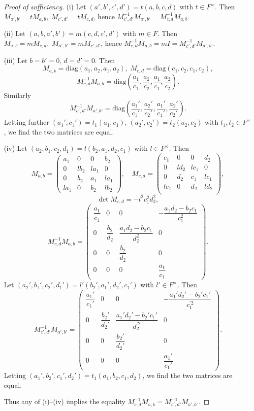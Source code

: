 \documentclass{article}
\begin{document}
\begin{proof}[Proof of sufficiency]
(i) Let $(a',b',c',d')=t(a,b,c,d)$ with $t\in F^{\times}$. Then
$M_{a',b'}=t M_{a,b},\; M_{c',d'}=t M_{c,d}$,
hence
$
M_{c',d'}^{-1}M_{a',b'} =M_{c,d}^{-1}M_{a,b}$.

(ii) Let $(a,b,a',b')=m(c,d,c',d')$ with $m\in F$.
Then
$M_{a,b}=m M_{c,d} , \; M_{a',b'}=m M_{c',d'}$,
hence
$M_{c,d}^{-1}M_{a,b}=mI=M_{c',d'}^{-1}M_{a',b'}$.

(iii)
Let $b=b'=0$, $d=d'=0$. 
Then
$$
M_{a,b}=\text{diag}(a_1,a_2,a_1,a_2),\;
M_{c,d}=\text{diag}(c_1,c_2,c_1,c_2),
$$
$$
M_{c,d}^{-1}M_{a,b}=\text{diag}(\frac{a_1}{c_1},\frac{a_2}{c_2},\frac{a_1}{c_1},\frac{a_2}{c_2}).
$$
Similarly
$$
M_{c',d'}^{-1}M_{a',b'}=\text{diag}(\frac{a_1'}{c_1'},\frac{a_2'}{c_2'},\frac{a_1'}{c_1'},\frac{a_2'}{c_2'}).
$$
Letting further $(a_1',c_1')=t_1(a_1,c_1)$, $(a_2',c_2')=t_2(a_2,c_2)$
with $t_1,t_2\in F^{\times}$, 
we find the two matrices are equal.

(iv)
Let $(a_2,b_1,c_2,d_1)=l(b_2,a_1,d_2,c_1)$ with $l\in F^{\times}$. Then
$$
M_{a,b}=
\begin{pmatrix}
a_1 & 0 & 0 & b_2 \\
0 & l b_2 & l a_1 & 0 \\
0 & b_2 & a_1 & l a_1\\
l a_1 & 0 & b_2 & l b_2 
\end{pmatrix},\quad
M_{c,d}=
\begin{pmatrix}
c_1 & 0 & 0 & d_2 \\
0 & l d_2 & l c_1 & 0 \\
0 & d_2 & c_1 & l c_1 \\
l c_1 & 0 & d_2 & l d_2 \\
\end{pmatrix},
$$
$$
\det M_{c,d}=-l^2 c_1^2 d_2^2,
$$
$$
M_{c,d}^{-1}M_{a,b}=
\begin{pmatrix}
\dfrac{a_1}{c_1} & 0 & 0 & -\dfrac{a_1d_2-b_2 c_1}{c_1^2}\\
0 & \dfrac{b_2}{d_2} & \dfrac{a_1d_2-b_2c_1}{d_2^2} & 0 \\
0 & 0 & \dfrac{b_2}{d_2} & 0 \\
0 & 0 & 0 & \dfrac{a_1}{c_1}
\end{pmatrix}.
$$
Let $(a_2',b_1',c_2',d_1')=l'(b_2',a_1',d_2',c_1')$ with $l'\in F^{\times}$. Then
$$
M_{c',d'}^{-1}M_{a',b'}=
\begin{pmatrix}
\dfrac{a_1'}{c_1'} & 0 & 0 & -\dfrac{a_1'd_2'-b_2'c_1'}{c_1^{\prime2}}\\
0 & \dfrac{b_2'}{d_2'} & \dfrac{a_1'd_2'-b_2'c_1'}{d_2^{\prime2}} & 0 \\
0 & 0 & \dfrac{b_2'}{d_2'} & 0 \\
0 & 0 & 0 & \dfrac{a_1'}{c_1'}
\end{pmatrix}.
$$
Letting $(a_1',b_2',c_1',d_2')=t_1(a_1,b_2,c_1,d_2)$, we find the two matrices are equal.

Thus any of (i)--(iv) implies the equality
$M_{c,d}^{-1}M_{a,b}= M_{c',d'}^{-1}M_{a',b'}$.

\end{proof}
\end{document}
